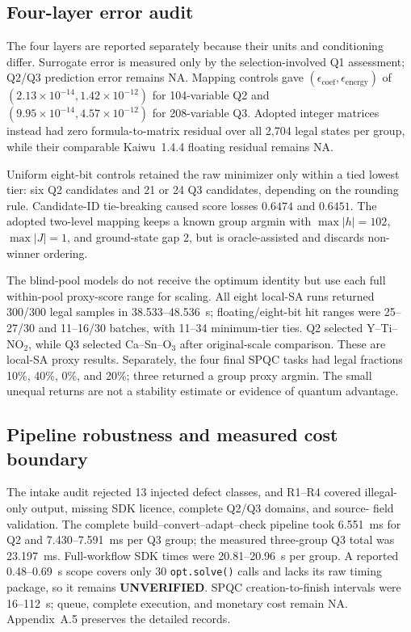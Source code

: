 \subsection{Four-layer error audit}

The four layers are reported separately because their units and conditioning
differ.  Surrogate error is measured only by the selection-involved Q1
assessment; Q2/Q3 prediction error remains NA.  Mapping controls gave
$(\epsilon_{\mathrm{coef}},\epsilon_{\mathrm{energy}})$ of
$(2.13\times10^{-14},1.42\times10^{-12})$ for 104-variable Q2 and
$(9.95\times10^{-14},4.57\times10^{-12})$ for 208-variable Q3.  Adopted
integer matrices instead had zero formula-to-matrix residual over all 2,704
legal states per group, while their comparable Kaiwu~1.4.4 floating residual
remains NA.

Uniform eight-bit controls retained the raw minimizer only within a tied
lowest tier: six Q2 candidates and 21 or 24 Q3 candidates, depending on the
rounding rule.  Candidate-ID tie-breaking caused score losses $0.6474$ and
$0.6451$.  The adopted two-level mapping keeps a known group argmin with
$\max|h|=102$, $\max|J|=1$, and ground-state gap 2, but is oracle-assisted
and discards non-winner ordering.

The blind-pool models do not receive the optimum identity but use each full
within-pool proxy-score range for scaling.  All eight local-SA runs returned
300/300 legal samples in 38.533--48.536~s; floating/eight-bit hit ranges were
25--27/30 and 11--16/30 batches, with 11--34 minimum-tier ties.  Q2 selected
Y--Ti--$\mathrm{NO}_2$, while Q3 selected Ca--Sn--$\mathrm O_3$ after
original-scale comparison.  These are local-SA proxy results.  Separately,
the four final SPQC tasks had legal fractions 10\%, 40\%, 0\%, and 20\%; three
returned a group proxy argmin.  The small unequal returns are not a stability
estimate or evidence of quantum advantage.

\subsection{Pipeline robustness and measured cost boundary}

The intake audit rejected 13 injected defect classes, and R1--R4 covered
illegal-only output, missing SDK licence, complete Q2/Q3 domains, and source-
field validation.  The complete build--convert--adapt--check pipeline took
6.551~ms for Q2 and 7.430--7.591~ms per Q3 group; the measured three-group Q3
total was 23.197~ms.  Full-workflow SDK times were 20.81--20.96~s per group.
A reported 0.48--0.69~s scope covers only 30 \texttt{opt.solve()} calls and
lacks its raw timing package, so it remains \textbf{UNVERIFIED}.  SPQC
creation-to-finish intervals were 16--112~s; queue, complete execution, and
monetary cost remain NA.  Appendix~A.5 preserves the detailed records.

